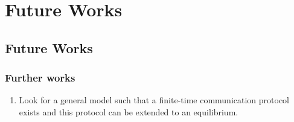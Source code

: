 \documentclass[9pt,handout]{beamer}
\begin{document}
%
%
%
%
%
%
%
%
%
%



\section{Future Works}
\subsection{Future Works}


\begin{frame}

\frametitle{Further works}


\begin{enumerate}
\item Look for a general model such that a finite-time communication protocol exists and this protocol can be extended to an equilibrium.

\end{enumerate}
\end{frame}
\end{document}
